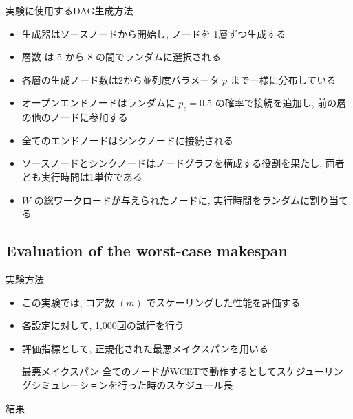 \begin{frame}{実験に使用するDAG生成方法}
    \begin{itemize}
        \item 生成器はソースノードから開始し, ノードを 1層ずつ生成する
        \item 層数 は 5 から 8 の間でランダムに選択される
        \item 各層の生成ノード数は2から並列度パラメータ $p$ まで一様に分布している
        \item オープンエンドノードはランダムに $p_{c}=0.5$ の確率で接続を追加し, 前の層の他のノードに参加する
        \item 全てのエンドノードはシンクノードに接続される
        \item ソースノードとシンクノードはノードグラフを構成する役割を果たし, 両者とも実行時間は1単位である
        \item $W$ の総ワークロードが与えられたノードに, 実行時間をランダムに割り当てる
    \end{itemize}
\end{frame}


\subsection{Evaluation of the worst-case makespan}
\label{ssec: Evaluation of the worst-case makespan}

\begin{frame}{実験方法}
    \begin{itemize}
        \item この実験では, コア数 $(m)$ でスケーリングした性能を評価する
        \item 各設定に対して, 1,000回の試行を行う
        \item 評価指標として, 正規化された最悪メイクスパンを用いる
              \begin{block}{最悪メイクスパン}
                  全てのノードがWCETで動作するとしてスケジューリングシミュレーションを行った時のスケジュール長
              \end{block}
    \end{itemize}
\end{frame}

\begin{frame}{結果}
\end{frame}

